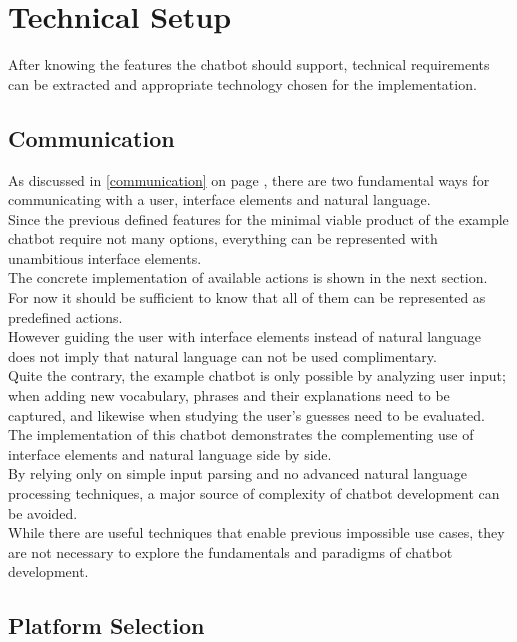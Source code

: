 \section{Technical Setup}


After knowing the features the chatbot should support,
technical requirements can be extracted
and appropriate technology chosen for the implementation.


\subsection{Communication}

As discussed in \ref{communication} on page \pageref{communication},
there are two fundamental ways for communicating with a user,
interface elements and natural language.
\\

Since the previous defined features for the minimal viable product of the example chatbot require not many options,
everything can be represented with unambitious interface elements.
\\

The concrete implementation of available actions is shown in the next section.
For now it should be sufficient to know that all of them can be represented as predefined actions.
\\
However guiding the user with interface elements instead of natural language
does not imply that natural language can not be used complimentary.
\\
Quite the contrary, the example chatbot is only possible by analyzing user input;
when adding new vocabulary, phrases and their explanations need to be captured,
and likewise when studying the user's guesses need to be evaluated.
\\

The implementation of this chatbot demonstrates the complementing use of interface elements and natural language side by side.
\\

By relying only on simple input parsing and no advanced natural language processing techniques,
a major source of complexity of chatbot development can be avoided.
\\
While there are useful techniques that enable previous impossible use cases,
they are not necessary to explore the fundamentals and paradigms of chatbot development.
\\

\subsection{Platform Selection}

